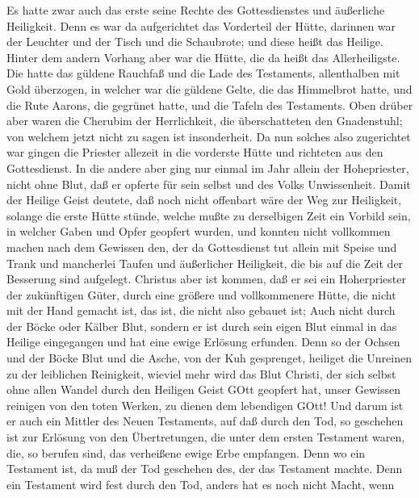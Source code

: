  Es hatte zwar auch das erste seine Rechte des
Gottesdienstes und äußerliche Heiligkeit.  Denn es war da
aufgerichtet das Vorderteil der Hütte, darinnen war der Leuchter und der
Tisch und die Schaubrote; und diese heißt das Heilige. 
Hinter dem andern Vorhang aber war die Hütte, die da heißt das
Allerheiligste.  Die hatte das güldene Rauchfaß und die Lade
des Testaments, allenthalben mit Gold überzogen, in welcher war die
güldene Gelte, die das Himmelbrot hatte, und die Rute Aarons, die
gegrünet hatte, und die Tafeln des Testaments.  Oben drüber
aber waren die Cherubim der Herrlichkeit, die überschatteten den
Gnadenstuhl; von welchem jetzt nicht zu sagen ist insonderheit.
 Da nun solches also zugerichtet war gingen die Priester
allezeit in die vorderste Hütte und richteten aus den Gottesdienst.
 In die andere aber ging nur einmal im Jahr allein der
Hohepriester, nicht ohne Blut, daß er opferte für sein selbst und des
Volks Unwissenheit.  Damit der Heilige Geist deutete, daß
noch nicht offenbart wäre der Weg zur Heiligkeit, solange die erste
Hütte stünde,  welche mußte zu derselbigen Zeit ein Vorbild
sein, in welcher Gaben und Opfer geopfert wurden, und konnten nicht
vollkommen machen nach dem Gewissen den, der da Gottesdienst tut
 allein mit Speise und Trank und mancherlei Taufen und
äußerlicher Heiligkeit, die bis auf die Zeit der Besserung sind
aufgelegt.  Christus aber ist kommen, daß er sei ein
Hoherpriester der zukünftigen Güter, durch eine größere und
vollkommenere Hütte, die nicht mit der Hand gemacht ist, das ist, die
nicht also gebauet ist;  Auch nicht durch der Böcke oder
Kälber Blut, sondern er ist durch sein eigen Blut einmal in das Heilige
eingegangen und hat eine ewige Erlösung erfunden.  Denn so
der Ochsen und der Böcke Blut und die Asche, von der Kuh gesprenget,
heiliget die Unreinen zu der leiblichen Reinigkeit, 
wieviel mehr wird das Blut Christi, der sich selbst ohne allen Wandel
durch den Heiligen Geist GOtt geopfert hat, unser Gewissen reinigen von
den toten Werken, zu dienen dem lebendigen GOtt!  Und darum
ist er auch ein Mittler des Neuen Testaments, auf daß durch den Tod, so
geschehen ist zur Erlösung von den Übertretungen, die unter dem ersten
Testament waren, die, so berufen sind, das verheißene ewige Erbe
empfangen.  Denn wo ein Testament ist, da muß der Tod
geschehen des, der das Testament machte.  Denn ein
Testament wird fest durch den Tod, anders hat es noch nicht Macht, wenn
